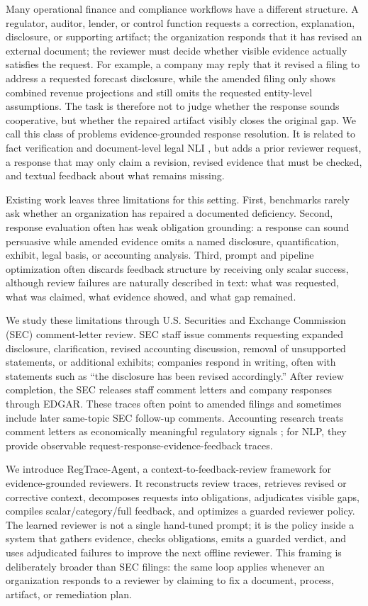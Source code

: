 \documentclass[11pt]{article}
\newcommand{\task}{evidence-grounded response resolution}
\newcommand{\framework}{RegTrace-Agent}
\begin{document}
Many operational finance and compliance workflows have a different structure. A regulator, auditor, lender, or control function requests a correction, explanation, disclosure, or supporting artifact; the organization responds that it has revised an external document; the reviewer must decide whether visible evidence actually satisfies the request. For example, a company may reply that it revised a filing to address a requested forecast disclosure, while the amended filing only shows combined revenue projections and still omits the requested entity-level assumptions. The task is therefore not to judge whether the response sounds cooperative, but whether the repaired artifact visibly closes the original gap. We call this class of problems \task{}. It is related to fact verification and document-level legal NLI \citep{thorne2018fever,koreeda2021contractnli}, but adds a prior reviewer request, a response that may only claim a revision, revised evidence that must be checked, and textual feedback about what remains missing.

Existing work leaves three limitations for this setting. First, benchmarks rarely ask whether an organization has repaired a documented deficiency. Second, response evaluation often has weak obligation grounding: a response can sound persuasive while amended evidence omits a named disclosure, quantification, exhibit, legal basis, or accounting analysis. Third, prompt and pipeline optimization often discards feedback structure by receiving only scalar success, although review failures are naturally described in text: what was requested, what was claimed, what evidence showed, and what gap remained.

We study these limitations through U.S. Securities and Exchange Commission (SEC) comment-letter review. SEC staff issue comments requesting expanded disclosure, clarification, revised accounting discussion, removal of unsupported statements, or additional exhibits; companies respond in writing, often with statements such as ``the disclosure has been revised accordingly.'' After review completion, the SEC releases staff comment letters and company responses through EDGAR. These traces often point to amended filings and sometimes include later same-topic SEC follow-up comments. Accounting research treats comment letters as economically meaningful regulatory signals \citep{cassell2013sec,bozanic2017sec,baugh2023auditor,ryans2021comment}; for NLP, they provide observable request-response-evidence-feedback traces.

We introduce \framework{}, a context-to-feedback-review framework for evidence-grounded reviewers. It reconstructs review traces, retrieves revised or corrective context, decomposes requests into obligations, adjudicates visible gaps, compiles scalar/category/full feedback, and optimizes a guarded reviewer policy. The learned reviewer is not a single hand-tuned prompt; it is the policy inside a system that gathers evidence, checks obligations, emits a guarded verdict, and uses adjudicated failures to improve the next offline reviewer. This framing is deliberately broader than SEC filings: the same loop applies whenever an organization responds to a reviewer by claiming to fix a document, process, artifact, or remediation plan.
\end{document}
